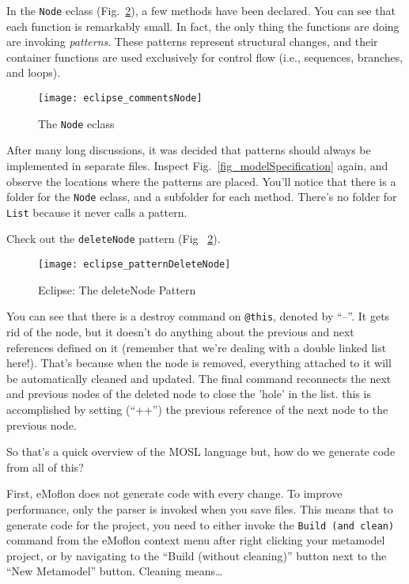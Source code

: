 In the \texttt{Node} eclass (Fig.~\ref{fig_patternDeleteNode}), a few methods have been declared. You can see that each function is remarkably small. In fact,
the only thing the functions are doing are invoking \emph{patterns}. These patterns represent structural changes, and their container functions are used
exclusively for control flow (i.e., sequences, branches, and loops).

 \begin{figure}[htbp]
  \centering
  \texttt{[image: eclipse\_commentsNode]}
  \caption{The \texttt{Node} eclass}
  \label{fig_eclassNode}
\end{figure}


After many long discussions, it was decided that patterns should always be implemented in separate files. Inspect Fig.~\ref{fig_modelSpecification} again, and
observe the locations where the patterns are placed. You'll notice that there is a folder for the \texttt{Node} eclass, and a subfolder for each method. There's
no folder for \texttt{List} because it never calls a pattern.

Check out the \texttt{deleteNode} pattern (Fig ~\ref{fig_patternDeleteNode}).

 \begin{figure}[htbp]
  \centering
  \texttt{[image: eclipse\_patternDeleteNode]}
  \caption{Eclipse: The deleteNode Pattern}
  \label{fig_patternDeleteNode}
\end{figure}

You can see that there is a destroy command on \texttt{@this}, denoted by ``--''. It gets rid of the node, but it doesn't do anything about the previous and
next references defined on it (remember that we're dealing with a double linked list here!). That's because when the node is removed, everything attached to it
will be automatically cleaned and updated. The final command reconnects the next and previous nodes of the deleted node to close the 'hole' in the list. this is
accomplished by setting (``++'') the previous reference of the next node to the previous node.
 
So that's a quick overview of the MOSL language but, how do we generate code from all of this?


First, eMoflon does not generate code with every change. To improve performance, only the parser is invoked when you save files. This means
that to generate code for the project, you need to either invoke the \texttt{Build (and clean)} command from the eMoflon context menu after right clicking your
metamodel project, or by navigating to the ``Build (without cleaning)'' button next to the ``New Metamodel'' button. Cleaning means\ldots
